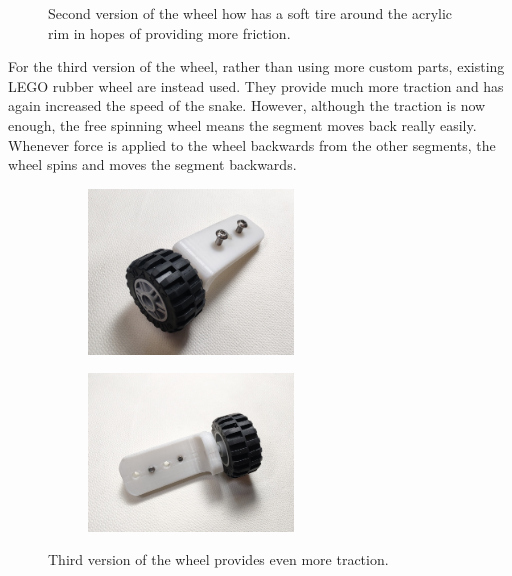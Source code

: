 \documentclass[twoside, 11pt]{article}
\begin{document}
\begin{figure} [H]
\begin{subfigure}[b]{0.33\linewidth}
		\subcaption{}
	\end{subfigure}
	\caption{Second version of the wheel how has a soft tire around the acrylic rim in hopes of providing more friction.}
\end{figure}

For the third version of the wheel, rather than using more custom parts, existing LEGO rubber wheel are instead used. They provide much more traction and has again increased the speed of the snake. However, although the traction is now enough, the free spinning wheel means the segment moves back really easily. Whenever force is applied to the wheel backwards from the other segments, the wheel spins and moves the segment backwards. 

\begin{figure} [H]
\centering
\begin{subfigure}[b]{0.5\linewidth}
		\centering
		\includegraphics[width=0.6\textwidth]{wheel3side}
		\subcaption{}
	\end{subfigure}%
	\begin{subfigure}[b]{0.5\linewidth}
		\centering		
		\includegraphics[width=0.6\textwidth]{wheel3top}
		\subcaption{}
	\end{subfigure}
	\caption{Third version of the wheel provides even more traction.}
\end{figure}
\end{document}
